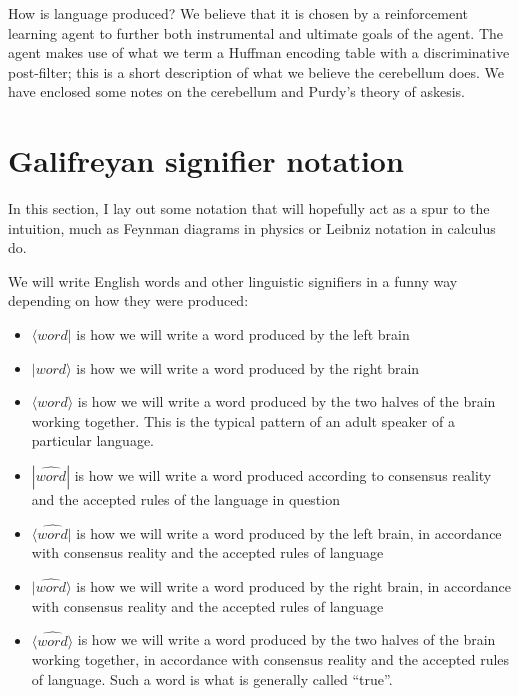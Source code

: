 \documentclass{article}
\begin{document}
How is language produced? We believe that it is chosen by a
reinforcement learning agent to further both instrumental and ultimate
goals of the agent. The agent makes use of what we term a Huffman
encoding table with a discriminative post-filter; this is a short
description of what we believe the cerebellum does. We have enclosed
some notes on the cerebellum and Purdy's theory of askesis.

\section{Galifreyan signifier notation}

In this section, I lay out some notation that will hopefully act as a
spur to the intuition, much as Feynman diagrams in physics or Leibniz
notation in calculus do.

We will write English words and other linguistic signifiers in a funny
way depending on how they were produced:

\begin{itemize}
\item $\langle word |$ is how we will write a word produced by the left brain
\item $| word \rangle$ is how we will write a word produced by the right brain
\item $\langle word \rangle$ is how we will write a word produced by
  the two halves of the brain working together. This is the typical
  pattern of an adult speaker of a particular language.

\item $| \widehat{word} |$ is how we will write a word produced
  according to consensus reality and the accepted rules of the
  language in question
\item $\langle \widehat{word} |$ is how we will write a word produced
  by the left brain, in accordance with consensus reality and the
  accepted rules of language
\item $| \widehat{word} \rangle$ is how we will write a word produced
  by the right brain, in accordance with consensus reality and the
  accepted rules of language
\item $\langle \widehat{word} \rangle$ is how we will write a word
  produced by the two halves of the brain working together, in
  accordance with consensus reality and the accepted rules of
  language. Such a word is what is generally called ``true''.
  
\end{itemize}
\end{document}
